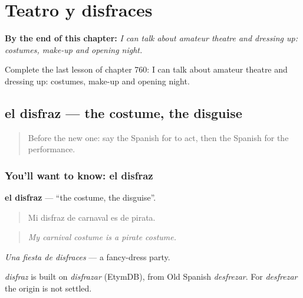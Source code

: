 
\chapter{Teatro y disfraces}
\label{ch:es-teatro-y-disfraces}

\begin{chapteropening}
\textbf{By the end of this chapter:} \emph{I can talk about amateur theatre and dressing up: costumes, make-up and opening night.}

Complete the last lesson of chapter 760: I can talk about amateur theatre and dressing up: costumes, make-up and opening night.
\end{chapteropening}

\section[el disfraz]{el disfraz — the costume, the disguise}

\label{lesson:ES-C760-disfraz}



\begin{quote}
Before the new one: say the Spanish for to act, then the Spanish for the performance.
\end{quote}

\subsection*{You'll want to know: el disfraz}
\textbf{el disfraz} — \textquotedblleft{}the costume, the disguise\textquotedblright{}.

\begin{quote}
Mi disfraz de carnaval es de pirata.
\end{quote}

\begin{quote}
\emph{My carnival costume is a pirate costume.}
\end{quote}

\emph{Una fiesta de disfraces} — a fancy-dress party.

\begin{cousinweb}
\emph{disfraz} is built on \emph{disfrazar} (EtymDB), from Old Spanish \emph{desfrezar}. For \emph{desfrezar} the origin is not settled.
\end{cousinweb}

